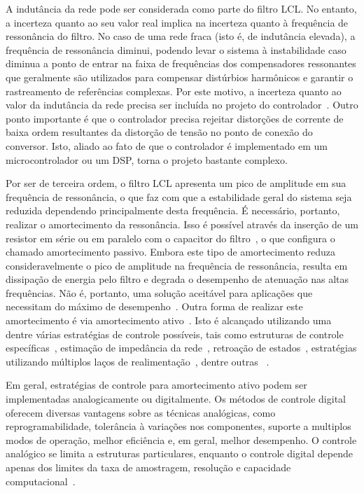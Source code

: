 	A indutância da rede pode ser considerada como parte do filtro LCL. No entanto, a incerteza quanto ao seu valor real implica na incerteza quanto à frequência de ressonância do filtro. No caso de uma rede fraca (isto é, de indutância elevada), a frequência de ressonância diminui, podendo levar o sistema à instabilidade caso diminua a ponto de entrar na faixa de frequências dos compensadores ressonantes que geralmente são utilizados para compensar distúrbios harmônicos e garantir o rastreamento de referências complexas. Por este motivo, a incerteza quanto ao valor da indutância da rede precisa ser incluída no projeto do controlador~\cite{ref:LISERRE}. Outro ponto importante é que o controlador precisa rejeitar distorções de corrente de baixa ordem resultantes da distorção de tensão no ponto de conexão do conversor. Isto, aliado ao fato de que o controlador é implementado em um microcontrolador ou um DSP, torna o projeto bastante complexo.

	Por ser de terceira ordem, o filtro LCL apresenta um pico de amplitude em sua frequência de ressonância, o que faz com que a estabilidade geral do sistema seja reduzida dependendo principalmente desta frequência. É necessário, portanto, realizar o amortecimento da ressonância. Isso é possível através da inserção de um resistor em série ou em paralelo com o capacitor do filtro~\cite{ref:AHMED}, o que configura o chamado amortecimento passivo. Embora este tipo de amortecimento reduza consideravelmente o pico de amplitude na frequência de ressonância, resulta em dissipação de energia pelo filtro e degrada o desempenho de atenuação nas altas frequências. Não é, portanto, uma solução aceitável para aplicações que necessitam do máximo de desempenho~\cite{ref:SHEN}. Outra forma de realizar este amortecimento é via amortecimento ativo~\cite{ref:GERVASIO}. Isto é alcançado utilizando uma dentre várias estratégias de controle possíveis, tais como estruturas de controle específicas~\cite{ref:WU}, estimação de impedância da rede~\cite{ref:BLAABJERG}, retroação de estados~\cite{ref:MASSING}, estratégias utilizando múltiplos laços de realimentação~\cite{ref:POH}, dentre outras~\cite{ref:WESSELS} \cite{ref:MORENO} \cite{ref:YANG}.

	Em geral, estratégias de controle para amortecimento ativo podem ser implementadas analogicamente ou digitalmente. Os métodos de controle digital oferecem diversas vantagens sobre as técnicas analógicas, como reprogramabilidade, tolerância à variações nos componentes, suporte a multiplos modos de operação, melhor eficiência e, em geral, melhor desempenho. O controle analógico se limita a estruturas particulares, enquanto o controle digital depende apenas dos limites da taxa de amostragem, resolução e capacidade computacional~\cite{ref:KIMBALL}.

